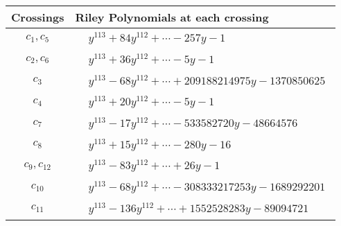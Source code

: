 \documentclass[1p]{elsarticle_modified}
\theoremstyle{definition}
\begin{document}
\begin{tabular}{m{50pt}|m{274pt}}
Crossings & \hspace{64pt}Riley Polynomials at each crossing \\
\hline $$\begin{aligned}c_{1},c_{5}\end{aligned}$$&$\begin{aligned}
&y^{113}+84 y^{112}+\cdots-257 y-1
\end{aligned}$\\
\hline $$\begin{aligned}c_{2},c_{6}\end{aligned}$$&$\begin{aligned}
&y^{113}+36 y^{112}+\cdots-5 y-1
\end{aligned}$\\
\hline $$\begin{aligned}c_{3}\end{aligned}$$&$\begin{aligned}
&y^{113}-68 y^{112}+\cdots+209188214975 y-1370850625
\end{aligned}$\\
\hline $$\begin{aligned}c_{4}\end{aligned}$$&$\begin{aligned}
&y^{113}+20 y^{112}+\cdots-5 y-1
\end{aligned}$\\
\hline $$\begin{aligned}c_{7}\end{aligned}$$&$\begin{aligned}
&y^{113}-17 y^{112}+\cdots-533582720 y-48664576
\end{aligned}$\\
\hline $$\begin{aligned}c_{8}\end{aligned}$$&$\begin{aligned}
&y^{113}+15 y^{112}+\cdots-280 y-16
\end{aligned}$\\
\hline $$\begin{aligned}c_{9},c_{12}\end{aligned}$$&$\begin{aligned}
&y^{113}-83 y^{112}+\cdots+26 y-1
\end{aligned}$\\
\hline $$\begin{aligned}c_{10}\end{aligned}$$&$\begin{aligned}
&y^{113}-68 y^{112}+\cdots-308333217253 y-1689292201
\end{aligned}$\\
\hline $$\begin{aligned}c_{11}\end{aligned}$$&$\begin{aligned}
&y^{113}-136 y^{112}+\cdots+1552528283 y-89094721
\end{aligned}$\\
\hline
\end{tabular}\\~\\
\end{document}

